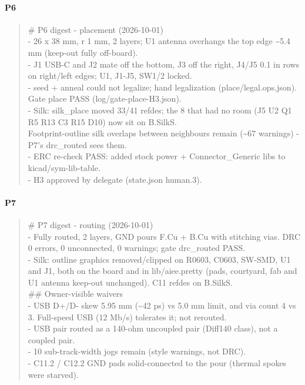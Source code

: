 \documentclass[11pt]{article}
\begin{document}
\paragraph*{P6}
\begin{quote}\small\ttfamily\raggedright
\# P6 digest - placement (2026-10-01)\\
- 26 x 38 mm, r 1 mm, 2 layers; U1 antenna overhangs the top edge \textasciitilde{}5.4 mm (keep-out fully off-board).\\
- J1 USB-C and J2 mate off the bottom, J3 off the right, J4/J5 0.1 in rows on right/left edges; U1, J1-J5, SW1/2 locked.\\
- seed + anneal could not legalize; hand legalization (place/legal.ops.json). Gate place PASS (log/gate-place-H3.json).\\
- Silk: silk\_place moved 33/41 refdes; the 8 that had no room (J5 U2 Q1 R5 R13 C3 R15 D10) now sit on B.SilkS.\\
  Footprint-outline silk overlaps between neighbours remain (\textasciitilde{}67 warnings) - P7's drc\_routed sees them.\\
- ERC re-check PASS: added stock power + Connector\_Generic libs to kicad/sym-lib-table.\\
- H3 approved by delegate (state.json human.3).
\end{quote}
\paragraph*{P7}
\begin{quote}\small\ttfamily\raggedright
\# P7 digest - routing (2026-10-01)\\
- Fully routed, 2 layers, GND pours F.Cu + B.Cu with stitching vias. DRC 0 errors, 0 unconnected, 0 warnings; gate drc\_routed PASS.\\
- Silk: outline graphics removed/clipped on R0603, C0603, SW-SMD, U1 and J1, both on the board and in lib/aiee.pretty (pads, courtyard, fab and U1 antenna keep-out unchanged). C11 refdes on B.SilkS.\\
\#\# Owner-visible waivers\\
- USB D+/D- skew 5.95 mm (\textasciitilde{}42 ps) vs 5.0 mm limit, and via count 4 vs 3. Full-speed USB (12 Mb/s) tolerates it; not rerouted.\\
- USB pair routed as a 140-ohm uncoupled pair (Diff140 class), not a coupled pair.\\
- 10 sub-track-width jogs remain (style warnings, not DRC).\\
- C11.2 / C12.2 GND pads solid-connected to the pour (thermal spokes were starved).
\end{quote}
\end{document}
